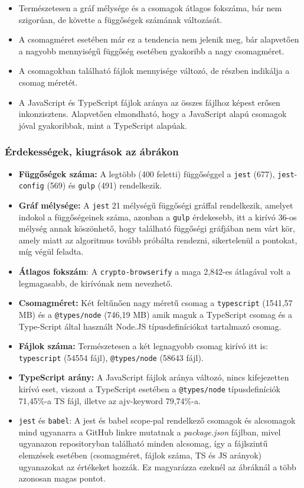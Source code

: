 \begin{itemize}
	\item Természetesen a gráf mélysége és a csomagok átlagos fokszáma, bár nem szigorúan, de követte a függőségek számának változását.
	\item A csomagméret esetében már ez a tendencia nem jelenik meg, bár alapvetően a nagyobb mennyiségű függőség esetében gyakoribb a nagy csomagméret.
	\item A csomagokban található fájlok mennyisége változó, de részben indikálja a csomag méretét.
	\item A JavaScript és TypeScript fájlok aránya az összes fájlhoz képest erősen inkonzisztens. Alapvetően elmondható, hogy a JavaScript alapú csomagok jóval gyakoribbak, mint a TypeScript alapúak.
\end{itemize}

\subsubsection{Érdekességek, kiugrások az ábrákon}

\begin{itemize}
	\item \textbf{Függőségek száma:} A legtöbb (400 feletti) függőséggel a \texttt{jest} (677), \texttt{jest}-\texttt{config} (569) és \texttt{gulp} (491) rendelkezik.
	\item \textbf{Gráf mélysége:} A \texttt{jest} 21 mélységű függőségi gráffal rendelkezik, amelyet indokol a függőségeinek száma, azonban a \texttt{gulp} érdekesebb, itt a kirívó 36-os mélység annak köszönhető, hogy található függőségi gráfjában nem várt kör, amely miatt az algoritmus tovább próbálta rendezni, sikertelenül a pontokat, míg végül feladta.
	\item \textbf{Átlagos fokszám}:  A \texttt{crypto-browserify} a maga 2,842-es átlagával volt a legmagasabb, de kirívónak nem nevezhető.
	\item \textbf{Csomagméret:} Két feltűnően nagy méretű csomag a \texttt{typescript} (1541,57 MB) és a \texttt{@types/node} (746,19 MB) amik maguk a TypeScript csomag és a Type-Script által használt Node.JS típusdefiníciókat tartalmazó csomag.
	\item \textbf{Fájlok száma:} Természetesen a két legnagyobb csomag kirívó itt is: \texttt{typescript} (54554 fájl), \texttt{@types/node} (58643 fájl).
	\item \textbf{TypeScript arány:} A JavaScript fájlok aránya változó, nincs kifejezetten kirívó eset, viszont a TypeScript esetében a \texttt{@types/node} típusdefiníciók 71,45\%-a TS fájl, illetve az ajv-keyword 79,74\%-a.
	\item \texttt{jest} és \texttt{babel}: A jest és babel scope-pal rendelkező csomagok és alcsomagok mind ugyanarra a GitHub linkre mutatnak a \emph{package.json} fájlban, mivel ugyanazon repositoryban található minden alcsomag, így a fájlszintű elemzések esetében (csomagméret, fájlok száma, TS és JS arányok) ugyanazokat az értékeket hozzák. Ez magyarázza ezeknél az ábráknál a több azonosan magas pontot.
	
\end{itemize}


